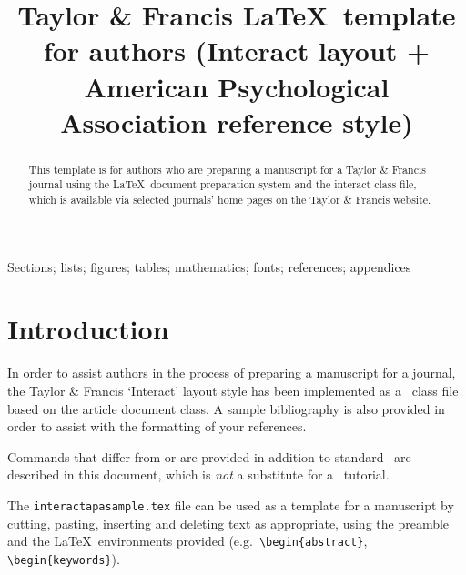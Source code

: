 \documentclass[]{interact}
\theoremstyle{plain}
\theoremstyle{definition}
\theoremstyle{remark}
\begin{document}

\title{Taylor \& Francis \LaTeX\ template for authors (\textsf{Interact} layout + American Psychological Association reference style)}

\author{
}

\maketitle

\begin{abstract}
This template is for authors who are preparing a manuscript for a Taylor \& Francis journal using the \LaTeX\ document preparation system and the \textsf{interact} class file, which is available via selected journals' home pages on the Taylor \& Francis website.
\end{abstract}

\begin{keywords}
Sections; lists; figures; tables; mathematics; fonts; references; appendices
\end{keywords}

\section{Introduction}

In order to assist authors in the process of preparing a manuscript for a journal, the Taylor \& Francis `Interact' layout style has been implemented as a \LaTeXe\ class file based on the \textsf{article} document class. A sample bibliography is also provided in order to assist with the formatting of your references.

Commands that differ from or are provided in addition to standard \LaTeXe\ are described in this document, which is \textit{not} a substitute for a \LaTeXe\ tutorial.

The \texttt{interactapasample.tex} file can be used as a template for a manuscript by cutting, pasting, inserting and deleting text as appropriate, using the preamble and the \LaTeX\ environments provided (e.g.\ \texttt{\textbackslash begin\{abstract\}}, \texttt{\textbackslash begin\{keywords\}}).
\end{document}
